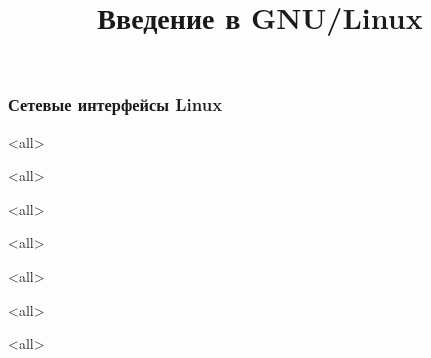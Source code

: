
\title{Введение в GNU/Linux}








\begin{frame}
	\frametitle{Сетевые интерфейсы Linux}
	\titlepage
	\vspace{-0.5cm}
	\begin{center}
	\end{center}
\end{frame}
\begin{frame}
	\tableofcontents
\end{frame}

\mode<all>{}

\mode<all>{}

\mode<all>{}

\mode<all>{}

\mode<all>{}

\mode<all>{}

\mode<all>{}


